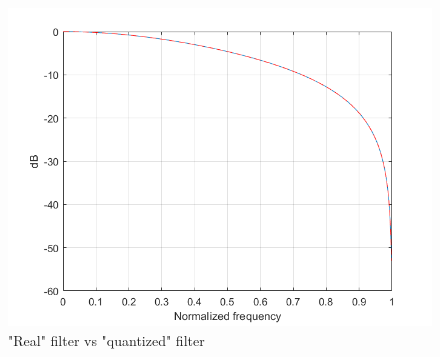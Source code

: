 \documentclass[a4paper, titlepage]{article}
\begin{document}
 \begin{figure} [h]
\centering
	\includegraphics[scale=0.6]{filtresponse_nb13.png}
	\caption{"Real" filter vs "quantized" filter}
	\label{fig:freq_res_matlab}
\end{figure}
\newpage
\end{document}
